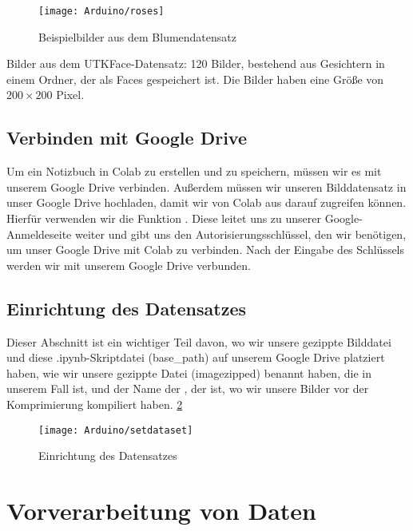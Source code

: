 \begin{figure}[H]
	\centering
	\texttt{[image: Arduino/roses]}
	\caption{Beispielbilder aus dem Blumendatensatz}
	\label{DatasetRoses}
\end{figure}

\bigskip

Bilder aus dem UTKFace-Datensatz: 120 Bilder, bestehend aus Gesichtern in einem Ordner, der als Faces gespeichert ist. Die Bilder haben eine Größe von $200 \times 200$ Pixel.

\subsection{Verbinden mit Google Drive}

Um ein Notizbuch in Colab zu erstellen und zu speichern, müssen wir es mit unserem Google Drive verbinden. Außerdem müssen wir unseren Bilddatensatz in unser Google Drive hochladen, damit wir von Colab aus darauf zugreifen können. Hierfür verwenden wir die Funktion . Diese leitet uns zu unserer Google-Anmeldeseite weiter und gibt uns den Autorisierungsschlüssel, den wir benötigen, um unser Google Drive mit Colab zu verbinden. Nach der Eingabe des Schlüssels werden wir mit unserem Google Drive verbunden.


\subsection{Einrichtung des Datensatzes}

Dieser Abschnitt ist ein wichtiger Teil davon, wo wir unsere gezippte Bilddatei und diese .ipynb-Skriptdatei (base\_path) auf unserem Google Drive platziert haben, wie wir unsere gezippte Datei (imagezipped) benannt haben, die in unserem Fall  ist, und der Name der , der  ist, wo wir unsere Bilder vor der Komprimierung kompiliert haben. \ref{GoogleColabDataset}

\begin{figure}[H]
	\centering
	\texttt{[image: Arduino/setdataset]}
	\caption{Einrichtung des Datensatzes}
	\label{GoogleColabDataset}
\end{figure}

\section{Vorverarbeitung von Daten}

